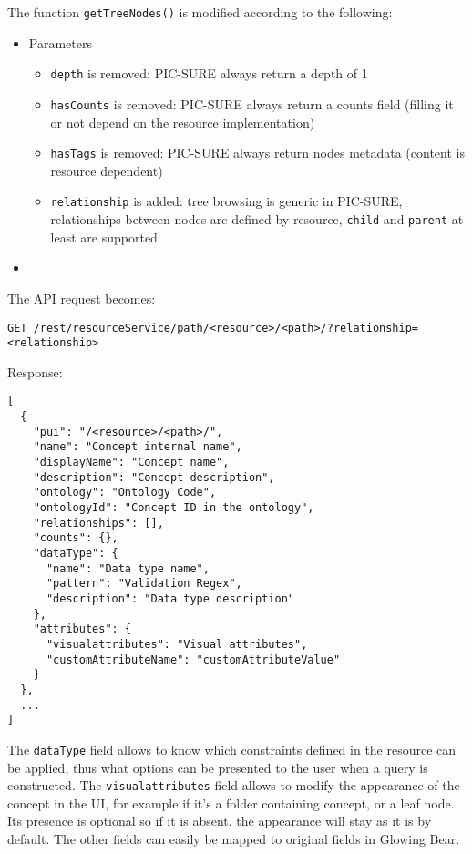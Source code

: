 The function \verb|getTreeNodes()| is modified according to the following:
\begin{itemize}
    \item Parameters
    \begin{itemize}
        \item \verb|depth| is removed: PIC-SURE always return a depth of 1
        \item \verb|hasCounts| is removed: PIC-SURE always return a counts field (filling it or not depend on the resource implementation)
        \item \verb|hasTags| is removed: PIC-SURE always return nodes metadata (content is resource dependent)
        \item \verb|relationship| is added: tree browsing is generic in PIC-SURE, relationships between nodes are defined by resource, \verb|child| and \verb|parent| at least are supported
    \end{itemize}
    \item 
\end{itemize}

The API request becomes:
\begin{verbatim}
GET /rest/resourceService/path/<resource>/<path>/?relationship=<relationship>
\end{verbatim}

Response:
\begin{verbatim}
[
  {
    "pui": "/<resource>/<path>/",
    "name": "Concept internal name",
    "displayName": "Concept name",
    "description": "Concept description",
    "ontology": "Ontology Code",
    "ontologyId": "Concept ID in the ontology",
    "relationships": [],
    "counts": {},
    "dataType": {
      "name": "Data type name",
      "pattern": "Validation Regex",
      "description": "Data type description"
    },
    "attributes": {
      "visualattributes": "Visual attributes",
      "customAttributeName": "customAttributeValue"
    }
  },
  ...
]
\end{verbatim}

The \verb|dataType| field allows to know which constraints defined in the resource can be applied, thus what options can be presented to the user when a query is constructed.
The \verb|visualattributes| field allows to modify the appearance of the concept in the UI, for example if it's a folder containing concept, or a leaf node. 
Its presence is optional so if it is absent, the appearance will stay as it is by default.
The other fields can easily be mapped to original fields in Glowing Bear.

